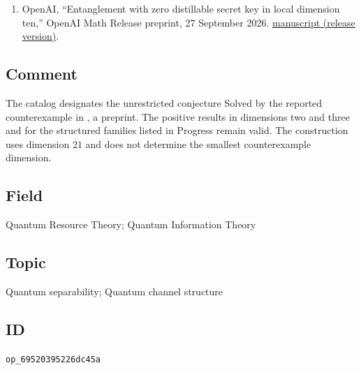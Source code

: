 \begin{enumerate}[label={},leftmargin=4.8em,labelsep=0.5em]
  \item[\textup{[OAI26]}]\label{ref:p32-openai-counterexample}
  OpenAI, ``Entanglement with zero distillable secret key in local dimension ten,'' OpenAI Math Release preprint, 27 September 2026.
\href{https://github.com/openai/math/blob/adc7f1241b42e322a6451854ab7e4b4c146bf78a/preprints/Entanglement-with-zero-distillable-secret-key-in-local-dimension-ten-September-27-2026/paper.pdf}{manuscript (release version)}.
\end{enumerate}

\subsection*{Comment}

The catalog designates the unrestricted conjecture Solved by the reported
  counterexample in , a
  preprint. The positive results in dimensions two and three and for the
  structured families listed in Progress remain valid. The construction
  uses dimension $21$ and does not determine the smallest counterexample
  dimension.

\subsection*{Field}

Quantum Resource Theory; Quantum Information Theory

\subsection*{Topic}

Quantum separability; Quantum channel structure

\subsection*{ID}

\texttt{op\_69520395226dc45a}
